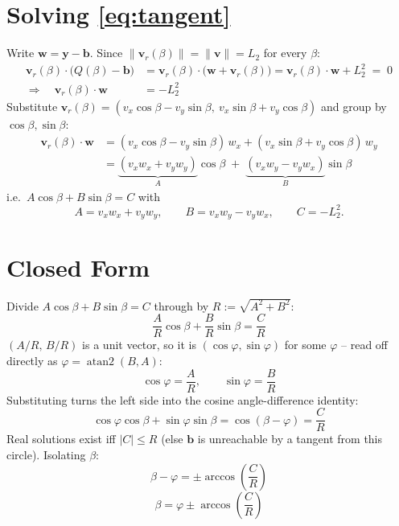\documentclass[11pt,a4paper]{article}
\begin{document}
\section{Solving \eqref{eq:tangent}}

Write $\mathbf w = \mathbf y - \mathbf b$. Since $\lVert\mathbf v_r(\beta)\rVert = \lVert\mathbf v\rVert = L_2$
for every $\beta$:
\begin{align}
\mathbf v_r(\beta)\cdot\big(Q(\beta)-\mathbf b\big)
&= \mathbf v_r(\beta)\cdot\big(\mathbf w + \mathbf v_r(\beta)\big)
 = \mathbf v_r(\beta)\cdot\mathbf w + L_2^2 \; = \; 0 \\[2pt]
\Longrightarrow\quad \mathbf v_r(\beta)\cdot\mathbf w &= -L_2^2
\end{align}
Substitute $\mathbf v_r(\beta) = (v_x\cos\beta - v_y\sin\beta,\ v_x\sin\beta + v_y\cos\beta)$ and
group by $\cos\beta,\sin\beta$:
\begin{align}
\mathbf v_r(\beta)\cdot\mathbf w
&= (v_x\cos\beta - v_y\sin\beta)\,w_x + (v_x\sin\beta + v_y\cos\beta)\,w_y \\
&= \underbrace{(v_xw_x + v_yw_y)}_{A}\cos\beta \;+\; \underbrace{(v_xw_y - v_yw_x)}_{B}\sin\beta
\end{align}
i.e.\ $A\cos\beta + B\sin\beta = C$ with
\begin{equation}
A = v_x w_x + v_y w_y, \qquad
B = v_x w_y - v_y w_x, \qquad
C = -L_2^2.
\end{equation}

\section{Closed Form}

Divide $A\cos\beta + B\sin\beta = C$ through by $R := \sqrt{A^2+B^2}$:
\begin{equation}
\frac{A}{R}\cos\beta + \frac{B}{R}\sin\beta = \frac{C}{R}
\end{equation}
$(A/R,\,B/R)$ is a unit vector, so it is $(\cos\varphi,\sin\varphi)$ for some $\varphi$ --
read off directly as $\varphi = \operatorname{atan2}(B,A)$:
\begin{equation}
\cos\varphi = \frac{A}{R}, \qquad \sin\varphi = \frac{B}{R}
\end{equation}
Substituting turns the left side into the cosine angle-difference identity:
\begin{equation}
\cos\varphi\cos\beta + \sin\varphi\sin\beta = \cos(\beta - \varphi) = \frac{C}{R}
\end{equation}
Real solutions exist iff $|C| \le R$ (else $\mathbf b$ is unreachable by a tangent from this
circle). Isolating $\beta$:
\begin{equation}
\beta - \varphi = \pm\arccos\!\left(\frac{C}{R}\right)
\end{equation}
\begin{equation}
\boxed{\ \beta = \varphi \pm \arccos\!\left(\frac{C}{R}\right)\ }
\end{equation}
\end{document}
